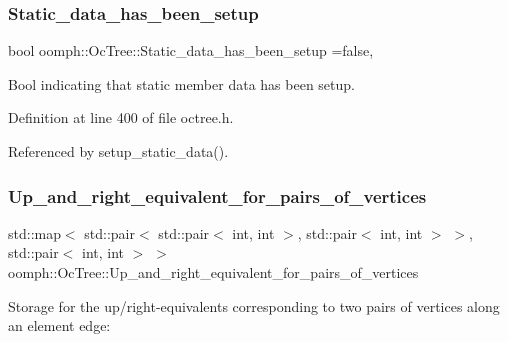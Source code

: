 \subsubsection{\texorpdfstring{Static\+\_\+data\+\_\+has\+\_\+been\+\_\+setup}{Static\_data\_has\_been\_setup}}
{\footnotesize\ttfamily bool oomph\+::\+Oc\+Tree\+::\+Static\+\_\+data\+\_\+has\+\_\+been\+\_\+setup =false\hspace{0.3cm}{\ttfamily [static]}, {\ttfamily [protected]}}



Bool indicating that static member data has been setup. 



Definition at line 400 of file octree.\+h.



Referenced by setup\+\_\+static\+\_\+data().

\mbox{\label{classoomph_1_1OcTree_a88cff579697781e1ec50c86517feec77}} 
\subsubsection{\texorpdfstring{Up\+\_\+and\+\_\+right\+\_\+equivalent\+\_\+for\+\_\+pairs\+\_\+of\+\_\+vertices}{Up\_and\_right\_equivalent\_for\_pairs\_of\_vertices}}
{\footnotesize\ttfamily std\+::map$<$ std\+::pair$<$ std\+::pair$<$ int, int $>$, std\+::pair$<$ int, int $>$ $>$, std\+::pair$<$ int, int $>$ $>$ oomph\+::\+Oc\+Tree\+::\+Up\+\_\+and\+\_\+right\+\_\+equivalent\+\_\+for\+\_\+pairs\+\_\+of\+\_\+vertices\hspace{0.3cm}{\ttfamily [static]}}



Storage for the up/right-\/equivalents corresponding to two pairs of vertices along an element edge\+: 


